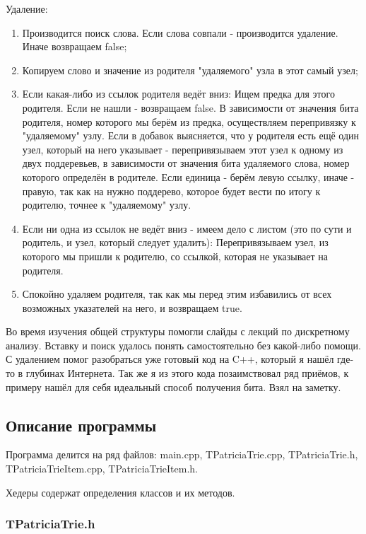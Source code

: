 \documentclass[12pt]{article}
\begin{document}
Удаление:
\begin{enumerate}
	\item Производится поиск слова. Если слова совпали - производится удаление. Иначе возвращаем false;
	\item Копируем слово и значение из родителя "удаляемого" узла в этот самый узел;
	\item Если какая-либо из ссылок родителя ведёт вниз:
		\subitem Ищем предка для этого родителя. Если не нашли - возвращаем false.
		\subitem В зависимости от значения бита родителя, номер которого мы берём из предка, осуществляем перепривязку к "удаляемому" узлу.
		\subitem Если в добавок выясняется, что у родителя есть ещё один узел, который на него указывает - перепривязываем этот узел к одному из двух поддеревьев, в зависимости от значения бита удаляемого слова, номер которого определён в родителе. Если единица - берём левую ссылку, иначе - правую, так как на нужно поддерево, которое будет вести по итогу к родителю, точнее к "удаляемому" узлу.
	\item Если ни одна из ссылок не ведёт вниз - имеем дело с листом (это по сути и родитель, и узел, который следует удалить):
		\subitem Перепривязываем узел, из которого мы пришли к родителю, со ссылкой, которая не указывает на родителя.
	\item Спокойно удаляем родителя, так как мы перед этим избавились от всех возможных указателей на него, и возвращаем true.
\end{enumerate}

Во время изучения общей структуры помогли слайды с лекций по дискретному анализу. Вставку и поиск удалось понять самостоятельно без какой-либо помощи. С удалением помог разобраться уже готовый код на C++, который я нашёл где-то в глубинах Интернета. Так же я из этого кода позаимствовал ряд приёмов, к примеру нашёл для себя идеальный способ получения бита. Взял на заметку.

\subsection*{Описание программы}

Программа делится на ряд файлов: main.cpp, TPatriciaTrie.cpp, TPatriciaTrie.h, TPatriciaTrieItem.cpp, TPatriciaTrieItem.h.

Хедеры содержат определения классов и их методов.

\subsubsection*{TPatriciaTrie.h}
\end{document}
